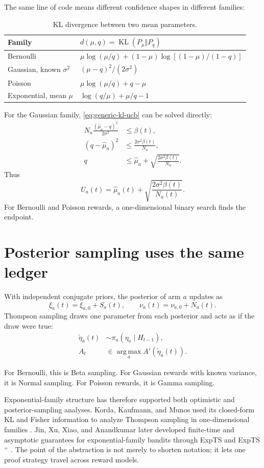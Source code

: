 \documentclass[en,nofont,11pt]{elegantbook}
\newcommand{\KL}{\operatorname{KL}}
\newcommand{\argmax}{\operatorname*{arg\,max}}
\begin{document}
The same line of code means different confidence shapes in different families:

\begin{table}[H]
\centering
\caption{KL divergence between two mean parameters.}
\begin{tabular}{p{}p{}}
\toprule
Family & $d(\mu,q)=\KL(P_\mu\Vert P_q)$ \\
\midrule
Bernoulli & $\mu\log(\mu/q)+(1-\mu)\log[(1-\mu)/(1-q)]$ \\
Gaussian, known $\sigma^2$ & $(\mu-q)^2/(2\sigma^2)$ \\
Poisson & $\mu\log(\mu/q)+q-\mu$ \\
Exponential, mean $\mu$ & $\log(q/\mu)+\mu/q-1$ \\
\bottomrule
\end{tabular}
\end{table}

For the Gaussian family, \eqref{eq:generic-kl-ucb} can be solved directly:
\begin{align*}
N_a\frac{(\widehat\mu_a-q)^2}{2\sigma^2}
&\le\beta(t),\\
(q-\widehat\mu_a)^2
&\le\frac{2\sigma^2\beta(t)}{N_a},\\
q
&\le\widehat\mu_a+\sqrt{\frac{2\sigma^2\beta(t)}{N_a}}.
\end{align*}
Thus
\[
U_a(t)
=
\widehat\mu_a(t)+\sqrt{\frac{2\sigma^2\beta(t)}{N_a(t)}}.
\]
For Bernoulli and Poisson rewards, a one-dimensional binary search finds the endpoint.

\section{Posterior sampling uses the same ledger}

With independent conjugate priors, the posterior of arm $a$ updates as
\[
\xi_a(t)=\xi_{a,0}+S_a(t),
\qquad
\nu_a(t)=\nu_{a,0}+N_a(t).
\]
Thompson sampling draws one parameter from each posterior and acts as if the draw were true:
\begin{align*}
\widetilde\eta_a(t)&\sim\pi_a(\eta_a\mid H_{t-1}),\\
A_t&\in\argmax_a A'(\widetilde\eta_a(t)).
\end{align*}

For Bernoulli, this is Beta sampling. For Gaussian rewards with known variance, it is Normal sampling. For Poisson rewards, it is Gamma sampling.

Exponential-family structure has therefore supported both optimistic and posterior-sampling analyses. Korda, Kaufmann, and Munos used its closed-form KL and Fisher information to analyze Thompson sampling in one-dimensional families \cite{korda2013thompson}. Jin, Xu, Xiao, and Anandkumar later developed finite-time and asymptotic guarantees for exponential-family bandits through ExpTS and ExpTS$^+$ \cite{jin2022expts}. The point of the abstraction is not merely to shorten notation; it lets one proof strategy travel across reward models.
\end{document}
